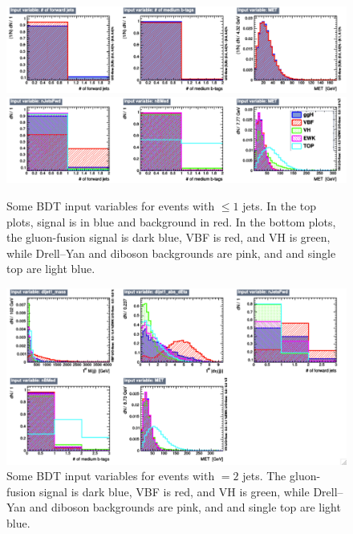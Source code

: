 \begin{figure}
  \includegraphics[width=1.0\linewidth]{figures/bdt_training/BDT_in_le1j_all_B.pdf}
  \includegraphics[width=1.0\linewidth]{figures/bdt_training/BDT_in_le1j_sep_B.pdf}
  \caption{Some BDT input variables for events with $\le 1$ jets.
           In the top plots, signal is in blue and background in red.
           In the bottom plots, the gluon-fusion signal is dark blue, VBF is red, and VH is green,
           while Drell--Yan and diboson backgrounds are pink, and \ttbar and single top are light blue.}
  \label{fig:BDT_in_le1j_B}
\end{figure}

\begin{figure}
  \includegraphics[width=1.0\linewidth]{figures/bdt_training/BDT_in_eq2j_sep_B.pdf}
  \caption{Some BDT input variables for events with $= 2$ jets.
           The gluon-fusion signal is dark blue, VBF is red, and VH is green,
           while Drell--Yan and diboson backgrounds are pink, and \ttbar and single top are light blue.}
  \label{fig:BDT_in_eq2j_B}
\end{figure}

